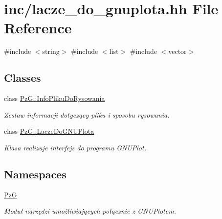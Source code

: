 \hypertarget{lacze__do__gnuplota_8hh}{}\section{inc/lacze\+\_\+do\+\_\+gnuplota.hh File Reference}
\label{lacze__do__gnuplota_8hh}
{\ttfamily \#include $<$string$>$}\newline
{\ttfamily \#include $<$list$>$}\newline
{\ttfamily \#include $<$vector$>$}\newline
\subsection*{Classes}
\begin{DoxyCompactItemize}
\item 
class \mbox{\hyperlink{class_pz_g_1_1_info_pliku_do_rysowania}{Pz\+G\+::\+Info\+Pliku\+Do\+Rysowania}}
\begin{DoxyCompactList}\small\item\em Zestaw informacji dotyczący pliku i sposobu rysowania. \end{DoxyCompactList}\item 
class \mbox{\hyperlink{class_pz_g_1_1_lacze_do_g_n_u_plota}{Pz\+G\+::\+Lacze\+Do\+G\+N\+U\+Plota}}
\begin{DoxyCompactList}\small\item\em Klasa realizuje interfejs do programu G\+N\+U\+Plot. \end{DoxyCompactList}\end{DoxyCompactItemize}
\subsection*{Namespaces}
\begin{DoxyCompactItemize}
\item 
 \mbox{\hyperlink{namespace_pz_g}{PzG}}
\begin{DoxyCompactList}\small\item\em Moduł narzędzi umożliwiających połącznie z G\+N\+U\+Plotem. \end{DoxyCompactList}\end{DoxyCompactItemize}
